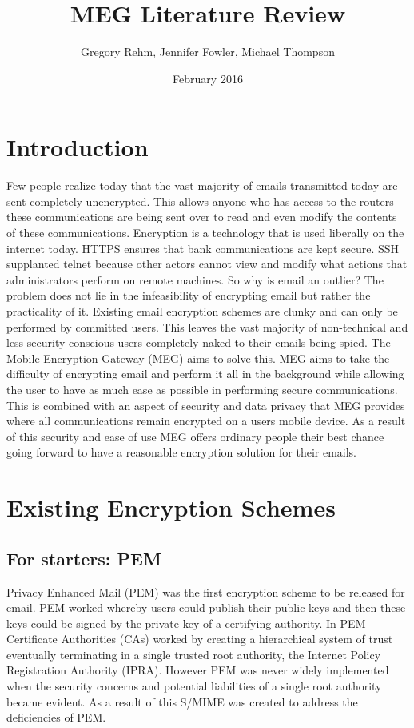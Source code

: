 \documentclass{article}
\begin{document}
\title{MEG Literature Review}
\author{Gregory Rehm, Jennifer Fowler, Michael Thompson}
\date{February 2016}

\maketitle

\section{Introduction}
\par Few people realize today that the vast majority of emails transmitted today are sent completely unencrypted. This allows anyone who has access to the routers these communications are being sent over to read and even modify the contents of these communications. Encryption is a technology that is used liberally on the internet today. HTTPS ensures that bank communications are kept secure. SSH supplanted telnet because other actors cannot view and modify what actions that administrators perform on remote machines. So why is email an outlier? The problem does not lie in the infeasibility of encrypting email but rather the practicality of it. Existing email encryption schemes are clunky and can only be performed by committed users. This leaves the vast majority of non-technical and less security conscious users completely naked to their emails being spied. The Mobile Encryption Gateway (MEG) aims to solve this. MEG aims to take the difficulty of encrypting email and perform it all in the background while allowing the user to have as much ease as possible in performing secure communications. This is combined with an aspect of security and data privacy that MEG provides where all communications remain encrypted on a users mobile device. As a result of this security and ease of use MEG offers ordinary people their best chance going forward to have a reasonable encryption solution for their emails.

\section{Existing Encryption Schemes}
\subsection{For starters: PEM}
\par Privacy Enhanced Mail (PEM) was the first encryption scheme to be released for email. PEM worked whereby users could publish their public keys and then these keys could be signed by the private key of a certifying authority. In PEM Certificate Authorities (CAs) worked by creating a hierarchical system of trust eventually terminating in a single trusted root authority, the Internet Policy Registration Authority (IPRA)\cite{garfinkel2005make,rfc1422}. However PEM was never widely implemented when the security concerns and potential liabilities of a single root authority became evident\cite{wiki-pem,payne2008brief}. As a result of this S/MIME was created to address the deficiencies of PEM.
\end{document}

